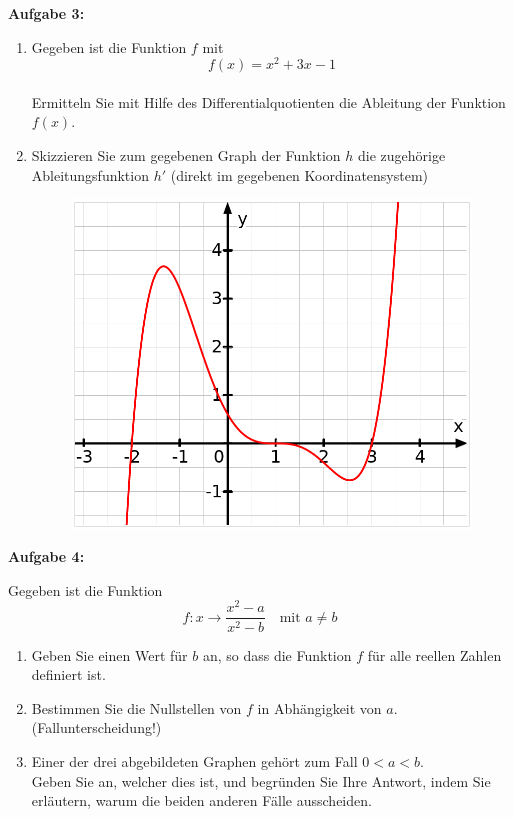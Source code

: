 \documentclass[a4paper,12pt]{article}
\newcommand{\Aufgabe}[1]{
  {
  \vspace*{0.5cm}
  \textsf{\textbf{Aufgabe #1}}
  \vspace*{0.2cm}
  
  }
}
\begin{document}
\Aufgabe{3:}
\begin{enumerate}[label={\alph*)}]
  \item Gegeben ist die Funktion $f$ mit 
    \[ f(x) = x^2+3x-1 \]\\
    Ermitteln Sie mit Hilfe des Differentialquotienten die Ableitung der Funktion $f(x)$.
    \item Skizzieren Sie zum gegebenen Graph der Funktion $h$ die zugehörige Ableitungsfunktion $h'$ (direkt im gegebenen Koordinatensystem)

\begin{figure}[h!]
  \begin{center}
    \includegraphics[width=0.9 \linewidth]{Q11_1KlausurJanuar2022_1.png}
  \end{center}
\end{figure}

\end{enumerate}

\newpage
\enlargethispage{4cm}
\Aufgabe{4:}
Gegeben ist die Funktion 
\[f:x \rightarrow \frac{x^2-a}{x^2-b} \quad \text{mit $a\neq b$}\]

\begin{enumerate}[label={\alph*)}]
  \item Geben Sie einen Wert für $b$ an, so dass die Funktion $f$ für alle reellen Zahlen definiert ist.
  \item Bestimmen Sie die Nullstellen von $f$ in Abhängigkeit von $a$. (Fallunterscheidung!)
  \item Einer der drei abgebildeten Graphen gehört zum Fall $0 < a < b$.\\
    Geben Sie an, welcher dies ist, und begründen Sie Ihre Antwort, indem Sie erläutern, warum die beiden anderen Fälle ausscheiden.
\end{enumerate}
\end{document}
